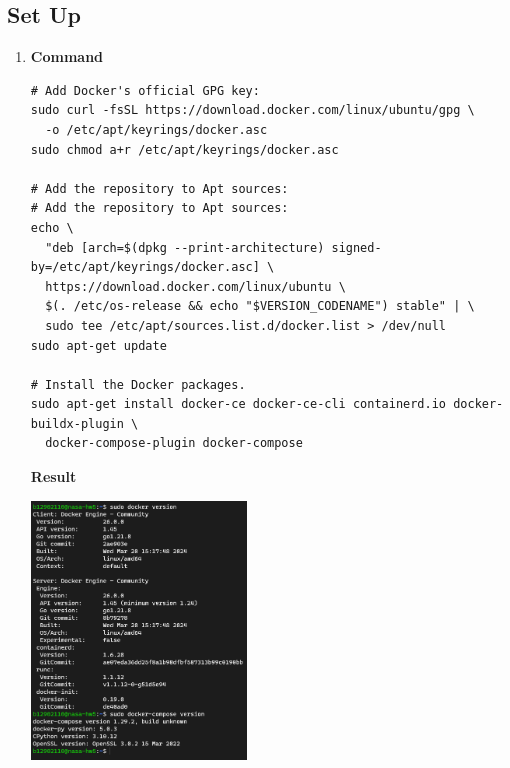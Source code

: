 \documentclass[12pt, a4paper]{article}
\begin{document}
  \subsection*{Set Up}
  \begin{enumerate}[resume]
    \item \textbf{Command}
    \begin{verbatim}
# Add Docker's official GPG key:
sudo curl -fsSL https://download.docker.com/linux/ubuntu/gpg \
  -o /etc/apt/keyrings/docker.asc
sudo chmod a+r /etc/apt/keyrings/docker.asc

# Add the repository to Apt sources:
# Add the repository to Apt sources:
echo \
  "deb [arch=$(dpkg --print-architecture) signed-by=/etc/apt/keyrings/docker.asc] \
  https://download.docker.com/linux/ubuntu \
  $(. /etc/os-release && echo "$VERSION_CODENAME") stable" | \
  sudo tee /etc/apt/sources.list.d/docker.list > /dev/null
sudo apt-get update

# Install the Docker packages.
sudo apt-get install docker-ce docker-ce-cli containerd.io docker-buildx-plugin \
  docker-compose-plugin docker-compose
    \end{verbatim}

   \textbf{Result}

   \includegraphics[width=0.45\textwidth]{2-1_docker_version.png}
  \end{enumerate}
\end{document}
